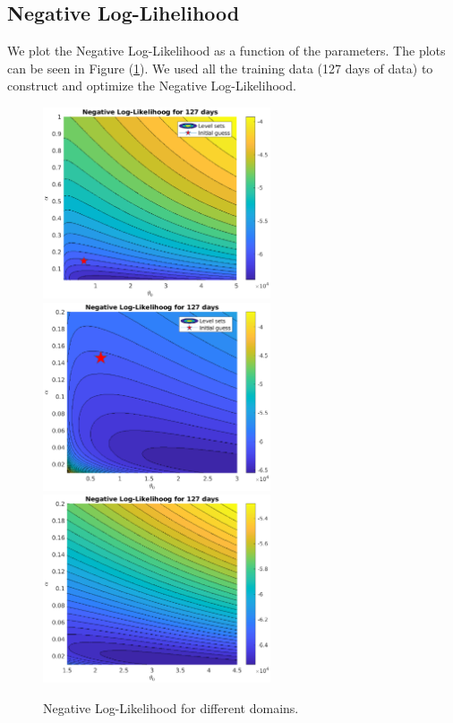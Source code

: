 \documentclass[11pt]{article}
\theoremstyle{definition}
\begin{document}
\subsection{Negative Log-Lihelihood}

We plot the Negative Log-Likelihood as a function of the parameters. The plots can be seen in Figure (\ref{fig:neg-LL}). We used all the training data (127 days of data) to construct and optimize the Negative Log-Likelihood.

\begin{figure}[H]
\centering
\includegraphics[width=0.6\textwidth]{plots/likelihood/Log-Likelihood.eps}\quad\includegraphics[width=0.6\textwidth]{plots/likelihood/Log-Likelihood_refined.eps}
\includegraphics[width=0.6\textwidth]{plots/likelihood/Log-Likelihood_more_refined.eps}
\caption{Negative Log-Likelihood for different domains.}
\label{fig:neg-LL}
\end{figure}
\end{document}
